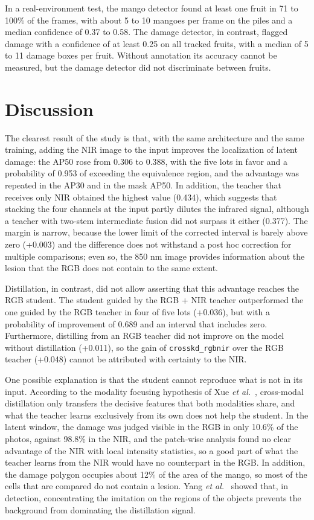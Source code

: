 \documentclass[journal]{IEEEtran}
\begin{document}
In a real-environment test, the mango detector found at least one fruit in 71 to 100\% of the frames, with about 5 to 10 mangoes per frame on the piles and a median confidence of 0.37 to 0.58. The damage detector, in contrast, flagged damage with a confidence of at least 0.25 on all tracked fruits, with a median of 5 to 11 damage boxes per fruit. Without annotation its accuracy cannot be measured, but the damage detector did not discriminate between fruits.

\section{Discussion}\label{sec:discussion}
The clearest result of the study is that, with the same architecture and the same training, adding the NIR image to the input improves the localization of latent damage: the AP50 rose from 0.306 to 0.388, with the five lots in favor and a probability of 0.953 of exceeding the equivalence region, and the advantage was repeated in the AP30 and in the mask AP50. In addition, the teacher that receives only NIR obtained the highest value (0.434), which suggests that stacking the four channels at the input partly dilutes the infrared signal, although a teacher with two-stem intermediate fusion did not surpass it either (0.377). The margin is narrow, because the lower limit of the corrected interval is barely above zero (+0.003) and the difference does not withstand a post hoc correction for multiple comparisons; even so, the 850 nm image provides information about the lesion that the RGB does not contain to the same extent.

Distillation, in contrast, did not allow asserting that this advantage reaches the RGB student. The student guided by the RGB + NIR teacher outperformed the one guided by the RGB teacher in four of five lots (+0.036), but with a probability of improvement of 0.689 and an interval that includes zero. Furthermore, distilling from an RGB teacher did not improve on the model without distillation (+0.011), so the gain of \texttt{crosskd\_\allowbreak rgbnir} over the RGB teacher (+0.048) cannot be attributed with certainty to the NIR.

One possible explanation is that the student cannot reproduce what is not in its input. According to the modality focusing hypothesis of Xue \emph{et al.}~\cite{xue2023}, cross-modal distillation only transfers the decisive features that both modalities share, and what the teacher learns exclusively from its own does not help the student. In the latent window, the damage was judged visible in the RGB in only 10.6\% of the photos, against 98.8\% in the NIR, and the patch-wise analysis found no clear advantage of the NIR with local intensity statistics, so a good part of what the teacher learns from the NIR would have no counterpart in the RGB. In addition, the damage polygon occupies about 12\% of the area of the mango, so most of the cells that are compared do not contain a lesion. Yang \emph{et al.}~\cite{yang2022} showed that, in detection, concentrating the imitation on the regions of the objects prevents the background from dominating the distillation signal.
\end{document}
